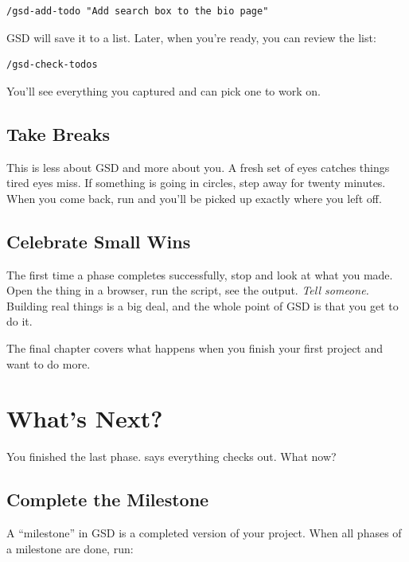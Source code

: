 \documentclass[11pt,letterpaper,openany]{book}
\begin{document}
\begin{lstlisting}
/gsd-add-todo "Add search box to the bio page"
\end{lstlisting}

GSD will save it to a list. Later, when you're ready, you can review
the list:

\begin{lstlisting}
/gsd-check-todos
\end{lstlisting}

You'll see everything you captured and can pick one to work on.

\section{Take Breaks}

This is less about GSD and more about you. A fresh set of eyes
catches things tired eyes miss. If something is going in circles,
step away for twenty minutes. When you come back, run
 and you'll be picked up exactly where you
left off.

\section{Celebrate Small Wins}

The first time a phase completes successfully, stop and look at
what you made. Open the thing in a browser, run the script, see
the output. \emph{Tell someone.} Building real things is a big
deal, and the whole point of GSD is that you get to do it.

\bigskip
\noindent The final chapter covers what happens when you finish
your first project and want to do more.

\chapter{What's Next?}

You finished the last phase.  says everything
checks out. What now?

\section{Complete the Milestone}

A ``milestone'' in GSD is a completed version of your project. When
all phases of a milestone are done, run:
\end{document}
